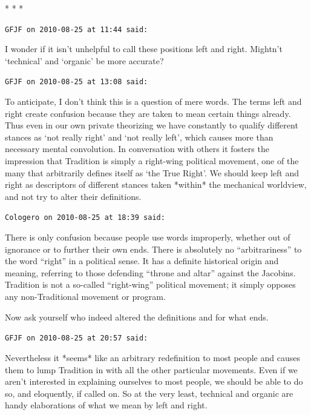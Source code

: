
\begin{center}* * *\end{center}

\begin{footnotesize}
\begin{sffamily}
\texttt{GFJF on 2010-08-25 at 11:44 said:}

I wonder if it isn't unhelpful to call these positions left and right. Mightn't `technical' and `organic' be more accurate?

\hfill

\texttt{GFJF on 2010-08-25 at 13:08 said:}

To anticipate, I don't think this is a question of mere words. The terms left and right create confusion because they are taken to mean certain things already. Thus even in our own private theorizing we have constantly to qualify different stances as `not really right' and `not really left', which causes more than necessary mental convolution. In conversation with others it fosters the impression that Tradition is simply a right-wing political movement, one of the many that arbitrarily defines itself as `the True Right'. We should keep left and right as descriptors of different stances taken *within* the mechanical worldview, and not try to alter their definitions.

\hfill

\texttt{Cologero on 2010-08-25 at 18:39 said:}

There is only confusion because people use words improperly, whether out of ignorance or to further their own ends. There is absolutely no ``arbitrariness'' to the word ``right'' in a political sense. It has a definite historical origin and meaning, referring to those defending ``throne and altar'' against the Jacobins. Tradition is not a so-called ``right-wing'' political movement; it simply opposes any non-Traditional movement or program.

Now ask yourself who indeed altered the definitions and for what ends.

\hfill

\texttt{GFJF on 2010-08-25 at 20:57 said:}

Nevertheless it *seems* like an arbitrary redefinition to most people and causes them to lump Tradition in with all the other particular movements. Even if we aren't interested in explaining ourselves to most people, we should be able to do so, and eloquently, if called on. So at the very least, technical and organic are handy elaborations of what we mean by left and right.


\end{sffamily}
\end{footnotesize}
